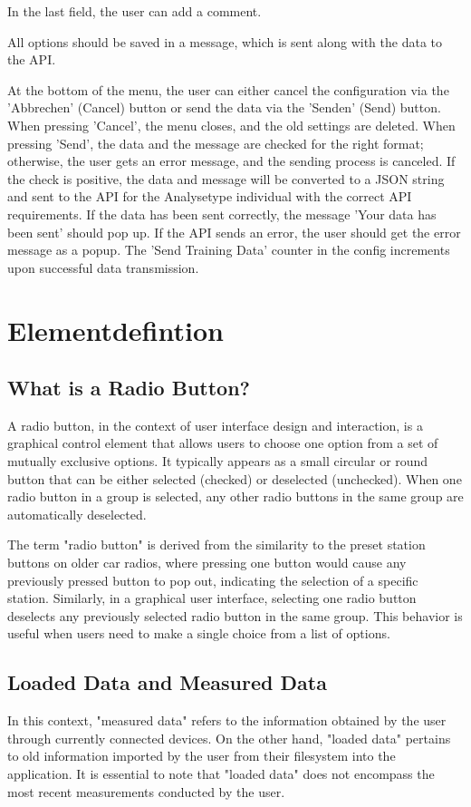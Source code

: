 \documentclass[]{scrreprt}
\begin{document}
In the last field, the user can add a comment.

All options should be saved in a message, which is sent along with the data to the API.

At the bottom of the menu, the user can either cancel the configuration via the 'Abbrechen' (Cancel) button or send the data via the 'Senden' (Send) button.
 When pressing 'Cancel', the menu closes, and the old settings are deleted. When pressing 'Send', the data and the message are checked for the right format; otherwise, the user gets an error message, 
 and the sending process is canceled. If the check is positive, the data and message will be converted to a JSON string and sent to the API for the Analysetype individual with the correct API requirements. 
 If the data has been sent correctly, the message 'Your data has been sent' should pop up.
 If the API sends an error, the user should get the error message as a popup. The 'Send Training Data' counter in the config increments upon successful data transmission.

 \section{Elementdefintion}

\subsection{What is a Radio Button?}\label{cap:RadioButton}

A radio button, in the context of user interface design and interaction, is a graphical control element that allows users to choose one option from a set of mutually exclusive options. 
It typically appears as a small circular or round button that can be either selected (checked) or deselected (unchecked). 
When one radio button in a group is selected, any other radio buttons in the same group are automatically deselected.

The term "radio button" is derived from the similarity to the preset station buttons on older car radios, where pressing one button would cause any previously pressed button to pop out,
 indicating the selection of a specific station. Similarly, in a graphical user interface, selecting one radio button deselects any previously selected radio button in the same group. 
 This behavior is useful when users need to make a single choice from a list of options.

\subsection{Loaded Data and Measured Data}\label{cap:loadedData}
In this context, "measured data" refers to the information obtained by the user through currently connected devices. On the other hand, "loaded data" 
pertains to old information imported by the user from their filesystem into the application. It is essential to note that "loaded data" does not encompass the most recent measurements conducted by the user. 
\end{document}

